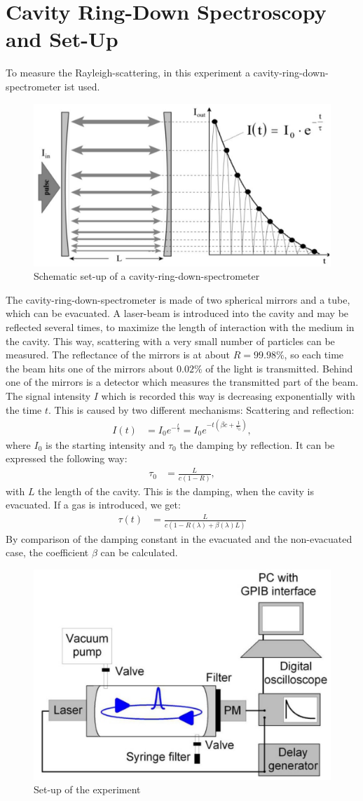 \documentclass[
	parskip=half,10pt,
	numbers= noenddot, %
	toc=flat, %
	oneside,
	twocolumn,
	]{scrartcl}
\begin{document}
\section{Cavity Ring-Down Spectroscopy and Set-Up}

To measure the Rayleigh-scattering, in this experiment a cavity-ring-down-spectrometer ist used. 
\begin{figure}[h]
\includegraphics[width=.48 \textwidth]{images/crds.pdf}
\caption{Schematic set-up of a cavity-ring-down-spectrometer \cite{wiki}}
\label{fig:set-up}
\end{figure}
The cavity-ring-down-spectrometer is made of two spherical mirrors and a tube, which can be evacuated. A laser-beam is introduced into the cavity and may be reflected 
several times, to maximize the length of interaction with the medium in the cavity. This way, scattering with a very small number of particles can be measured. 
The reflectance of the mirrors is at about $R=99.98 \%$, so each time the beam hits one of the mirrors about $0.02\%$ of the light is 
transmitted. Behind one of the mirrors is a detector which measures the transmitted part of the beam. The signal intensity $I$ which is recorded this way is 
decreasing exponentially with the time $t$. This is caused by two different mechanisms: Scattering and reflection:
\begin{align}
I(t) &= I_0 e^{-\frac{t}{\tau}}=I_0 e^{- t \left ( \beta c + \frac{1}{\tau_0} \right )},
\end{align}
where $I_0$ is the starting intensity and $\tau_0$ the damping by reflection. It can be expressed the following way:
\begin{align}
\tau_0 &= \frac{L}{c(1-R)},
\end{align}
with $L$ the length of the cavity. This is the damping, when the cavity is evacuated. If a gas is introduced, we get:
\begin{align}
\tau(t) &= \frac{L}{c(1-R(\lambda) + \beta(\lambda)L)}
\end{align}
By comparison of the damping constant in the evacuated and the non-evacuated case, the coefficient $\beta$ can be calculated. 

\begin{figure}[b]
\includegraphics[width = .48 \textwidth]{images/aufbau.pdf}
\caption{Set-up of the experiment \citep{wiki}}
\label{fig:experiment}
\end{figure}

\newpage


\end{document}

